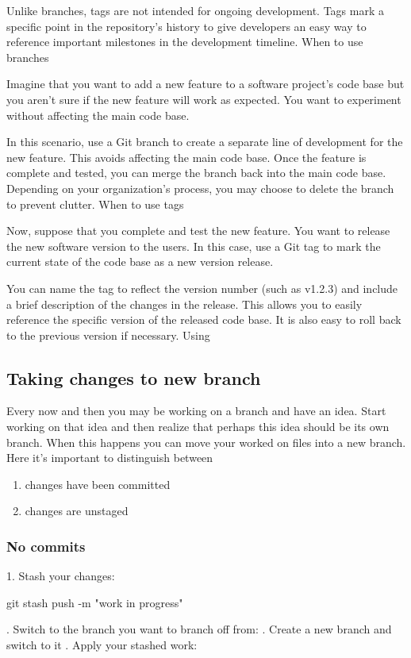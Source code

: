 Unlike branches, tags are not intended for ongoing development. Tags mark a specific point in the repository’s history to give developers an easy way to reference important milestones in the development timeline.
When to use branches

Imagine that you want to add a new feature to a software project’s code base but you aren’t sure if the new feature will work as expected. You want to experiment without affecting the main code base.

In this scenario, use a Git branch to create a separate line of development for the new feature. This avoids affecting the main code base. Once the feature is complete and tested, you can merge the branch back into the main code base. Depending on your organization’s process, you may choose to delete the branch to prevent clutter.
When to use tags

Now, suppose that you complete and test the new feature. You want to release the new software version to the users. In this case, use a Git tag to mark the current state of the code base as a new version release.

You can name the tag to reflect the version number (such as v1.2.3) and include a brief description of the changes in the release. This allows you to easily reference the specific version of the released code base. It is also easy to roll back to the previous version if necessary.
Using 

\subsection{Taking changes to new branch}
Every now and then you may be working on a branch and have an idea. Start working on that idea and then realize that perhaps this idea should be its own branch. When this happens you can move your worked on files into a new branch. Here it's important to distinguish between 
\begin{enumerate}
    \item changes have been committed
    \item changes are unstaged
\end{enumerate}

\subsubsection{No commits}
1. Stash your changes: \footnotemark
\begin{gitBashBox}
git stash push -m "work in progress"
\end{gitBashBox}. Switch to the branch you want to branch off from: . Create a new branch and switch to it . Apply your stashed work: 

